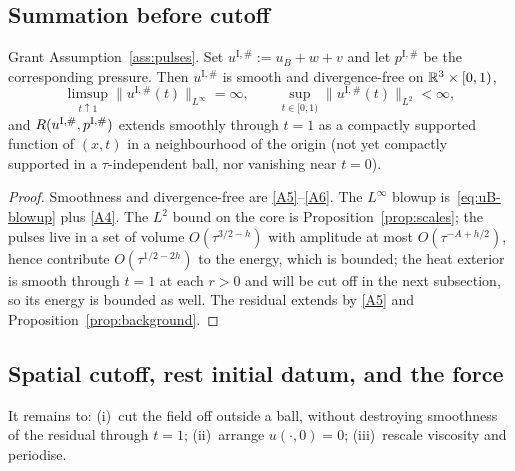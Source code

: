 \subsection{Summation before cutoff}

\begin{proposition}
\label{prop:prelocal-I}
Grant Assumption~\ref{ass:pulses}. Set $u^{\mathrm I,\#}:=u_B+w+v$ and let $p^{\mathrm I,\#}$ be the corresponding pressure. Then $u^{\mathrm I,\#}$ is smooth and divergence-free on $\mathbb{R}^3\times[0,1)$,
\[
\limsup_{t\uparrow 1}\|u^{\mathrm I,\#}(t)\|_{L^\infty}=\infty,
\qquad
\sup_{t\in[0,1)}\|u^{\mathrm I,\#}(t)\|_{L^2}<\infty,
\]
and $R(u^{\mathrm I,\#},p^{\mathrm I,\#})$ extends smoothly through $t=1$ as a compactly supported function of $(x,t)$ in a neighbourhood of the origin (not yet compactly supported in a $\tau$-independent ball, nor vanishing near $t=0$).
\end{proposition}

\begin{proof}
Smoothness and divergence-free are \ref{A5}--\ref{A6}. The $L^\infty$ blowup is~\eqref{eq:uB-blowup} plus \ref{A4}. The $L^2$ bound on the core is Proposition~\ref{prop:scales}; the pulses live in a set of volume $O(\tau^{3/2-h})$ with amplitude at most $O(\tau^{-A+h/2})$, hence contribute $O(\tau^{1/2-2h})$ to the energy, which is bounded; the heat exterior is smooth through $t=1$ at each $r>0$ and will be cut off in the next subsection, so its energy is bounded as well. The residual extends by \ref{A5} and Proposition~\ref{prop:background}.
\end{proof}

\subsection{Spatial cutoff, rest initial datum, and the force}
\label{sec:cutoff}

It remains to: (i)~cut the field off outside a ball, without destroying smoothness of the residual through $t=1$; (ii)~arrange $u(\cdot,0)=0$; (iii)~rescale viscosity and periodise.


